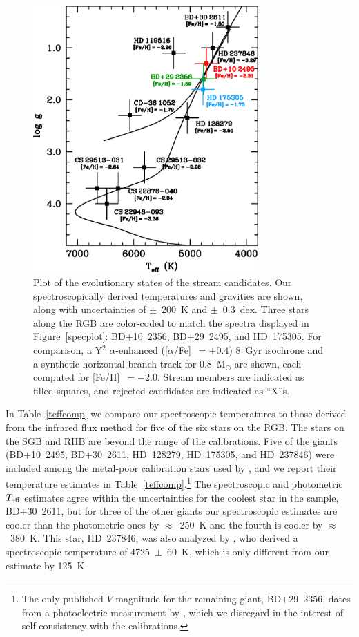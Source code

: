 \documentclass{emulateapj}
\begin{document}
\begin{figure}
\includegraphics[angle=0,width=3.4in]{fig02.eps}
\caption{
\label{cmd}
Plot of the evolutionary states of the stream candidates.
Our spectroscopically derived temperatures and gravities are shown, 
along with uncertainties of $\pm$~200~K and $\pm$~0.3~dex.
Three stars along the RGB are color-coded to match
the spectra displayed in Figure~\ref{specplot}:
\mbox{BD$+$10~2356},
\mbox{BD$+$29~2495}, and
\mbox{HD~175305}.
For comparison, a Y$^{2}$ $\alpha$-enhanced ([$\alpha$/Fe]~$=+0.4$)
8~Gyr isochrone 
\citep{demarque04} and a synthetic horizontal branch track 
for 0.8~M$_{\odot}$ \citep{cassisi04} are shown, 
each computed for [Fe/H]~$=-2.0$.
Stream members are indicated as filled squares, and
rejected candidates are indicated as ``X''s.
}
\end{figure}


In Table~\ref{teffcomp} we compare our spectroscopic temperatures 
to those derived from the infrared flux method \citep{alonso99a,alonso99b}
for five of the six stars on the RGB.
The stars on the SGB and RHB are beyond the range of the calibrations.
Five of the giants (\mbox{BD$+$10~2495}, 
\mbox{BD$+$30~2611}, \mbox{HD~128279}, \mbox{HD~175305}, and \mbox{HD~237846})
were included among the metal-poor calibration stars used by 
\citet{alonso99a}, and we report their temperature estimates in 
Table~\ref{teffcomp}.\footnote{
The only published $V$ magnitude for the remaining giant, 
\mbox{BD$+$29~2356}, dates from
a photoelectric measurement by \citet{harris64}, which we
disregard in the interest of self-consistency with the \citet{alonso99a}
calibrations.}
The spectroscopic and photometric $T_{\rm eff}$ estimates agree within
the uncertainties for the coolest star in the sample, \mbox{BD$+$30~2611}, 
but for three of the other giants our spectroscopic estimates 
are cooler than the photometric ones by $\approx$~250~K
and the fourth is cooler by $\approx$~380~K.
This star, \mbox{HD~237846}, was also analyzed by
\citet{zhang09}, who derived a spectroscopic temperature
of 4725~$\pm$~60~K, which is only different from our
estimate by 125~K.
\end{document}

